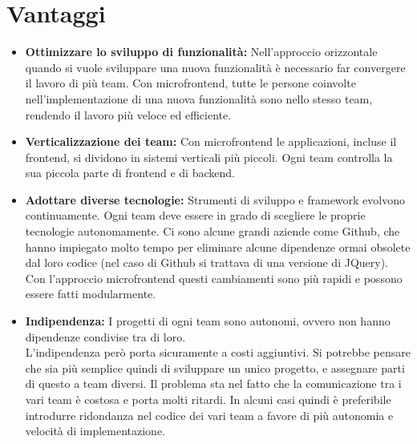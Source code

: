 \section{Vantaggi}
\begin{itemize}
    \item \textbf{Ottimizzare lo sviluppo di funzionalità:}
Nell’approccio orizzontale quando si vuole sviluppare una nuova funzionalità è necessario far convergere il 
lavoro di più team. Con microfrontend,
  tutte le persone coinvolte nell’implementazione di una nuova funzionalità sono nello 
  stesso team, rendendo il lavoro più veloce ed efficiente. 
    \item \textbf{Verticalizzazione dei team:}
Con microfrontend le applicazioni, incluse il frontend, si dividono in sistemi verticali
 più piccoli. Ogni team controlla la sua piccola parte di frontend e di backend.
    \item \textbf{Adottare diverse tecnologie:}
Strumenti di sviluppo e framework evolvono continuamente. Ogni team deve essere in grado di scegliere
le proprie tecnologie autonomamente. Ci sono alcune grandi aziende
 come Github, che hanno
 impiegato molto tempo per eliminare alcune dipendenze ormai obsolete dal loro codice (nel caso di Github si trattava di una versione di JQuery).
  Con l’approccio microfrontend questi cambiamenti sono più rapidi e possono essere
   fatti modularmente.


\item \textbf{Indipendenza:}
I progetti di ogni team sono autonomi, ovvero non hanno dipendenze condivise tra di loro.\\
L’indipendenza però porta sicuramente a costi aggiuntivi. Si potrebbe pensare che sia
 più semplice quindi di sviluppare un unico progetto, e assegnare parti di questo a team diversi. 
 Il problema sta nel fatto che la comunicazione tra i vari team è costosa e porta molti ritardi.
In alcuni casi quindi è preferibile introdurre ridondanza nel codice dei vari team a favore di più autonomia e velocità di
 implementazione.

\end{itemize}

